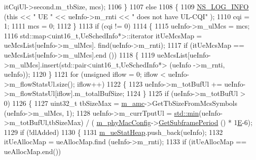 \begin{DoxyCode}
      itCqiUl->second.m\_tbSize, mcs);
1106                 \}
1107                 \textcolor{keywordflow}{else}
1108                 \{
1109                         \hyperlink{group__logging_gafbd73ee2cf9f26b319f49086d8e860fb}{NS\_LOG\_INFO} (\textcolor{keyword}{this} << \textcolor{stringliteral}{" UE "} << ueInfo->m\_rnti << \textcolor{stringliteral}{" does not have UL-CQI"}
      );
1110                         cqi = 1;
1111                         mcs = 0;
1112                 \}
1113                 \textcolor{keywordflow}{if} (cqi != 0)
1114                 \{
1115                         ueInfo->m\_ulMcs = mcs;
1116                         std::map<uint16\_t,UeSchedInfo*>::iterator itUeMcsMap = ueMcsList[ueInfo->m\_ulMcs].
      find(ueInfo->m\_rnti);
1117                         \textcolor{keywordflow}{if} (itUeMcsMap == ueMcsList[ueInfo->m\_ulMcs].end ())
1118                         \{
1119                                 ueMcsList[ueInfo->m\_ulMcs].insert(std::pair<uint16\_t,UeSchedInfo*> (ueInfo
      ->m\_rnti, ueInfo));
1120                         \}
1121                         \textcolor{keywordflow}{for} (\textcolor{keywordtype}{unsigned} iflow = 0; iflow < ueInfo->m\_flowStatsUl.size(); iflow++)
1122                         \{
1123                                 ueInfo->m\_totBufUl += ueInfo->m\_flowStatsUl[iflow].m\_totalBufSize;
1124                         \}
1125                         \textcolor{keywordflow}{if} (ueInfo->m\_totBufUl > 0)
1126                         \{
1127                                 uint32\_t tbSizeMax = \hyperlink{classns3_1_1MmWaveFlexTtiMaxRateMacScheduler_a8a84d69426586fddd45abe7174da607d}{m\_amc}->GetTbSizeFromMcsSymbols (ueInfo->m\_ulMcs, 
      1);
1128                                 ueInfo->m\_currTputUl = \hyperlink{80211b_8c_ac6afabdc09a49a433ee19d8a9486056d}{std::min}(ueInfo->m\_totBufUl,tbSizeMax) / (
      \hyperlink{classns3_1_1MmWaveMacScheduler_a24d7af4971d2e500fe543cefbafa2fd9}{m\_phyMacConfig}->\hyperlink{classns3_1_1MmWavePhyMacCommon_a1d402260d29c8931dd3dde73b295e23d}{GetSubframePeriod} () * 1\hyperlink{packet-test-suite_8cc_a171669980e29849aa5e3722d573181ee}{E}-6);
1129                                 \textcolor{keywordflow}{if} (!dlAdded)
1130                                 \{
1131                                         \hyperlink{classns3_1_1MmWaveFlexTtiMaxRateMacScheduler_aa87c4d83cfc37af1f40280bc303594d6}{m\_ueStatHeap}.push\_back(ueInfo);
1132                                         itUeAllocMap = ueAllocMap.find (ueInfo->m\_rnti);
1133                                         \textcolor{keywordflow}{if} (itUeAllocMap == ueAllocMap.end())

\end{DoxyCode}
